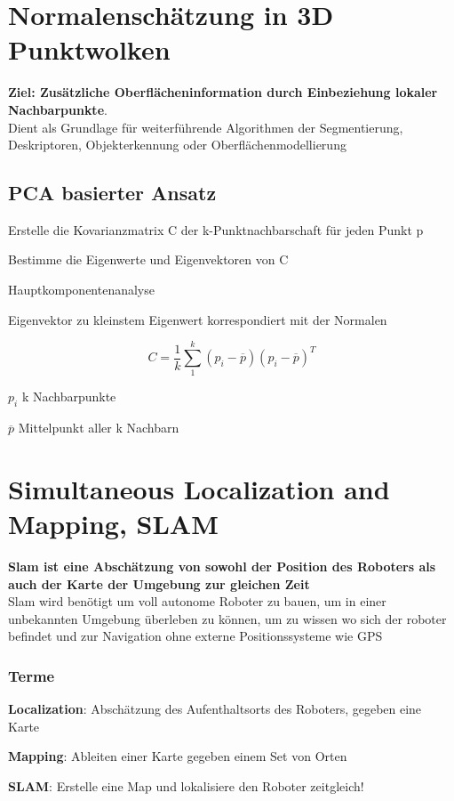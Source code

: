 \section{Normalenschätzung in 3D Punktwolken}
\textbf{Ziel: Zusätzliche Oberflächeninformation durch Einbeziehung lokaler
Nachbarpunkte}. \\
Dient als Grundlage für weiterführende Algorithmen der Segmentierung,
Deskriptoren, Objekterkennung oder Oberflächenmodellierung

\subsection{PCA basierter Ansatz}
\begin{compactitem}
    \item Erstelle die Kovarianzmatrix C der k-Punktnachbarschaft für jeden Punkt p
    \item Bestimme die Eigenwerte und Eigenvektoren von C
    \begin{compactitem}
        \item Hauptkomponentenanalyse
        \item Eigenvektor zu kleinstem Eigenwert korrespondiert mit der Normalen
    \end{compactitem}
\end{compactitem}
\begin{displaymath}
     C = \frac{1}{k}\sum_1^k (p_i - \overline{p})(p_i - \overline{p})^T
\end{displaymath}
\begin{compactitem}
    \item $p_i$ k Nachbarpunkte
    \item $\overline{p}$ Mittelpunkt aller k Nachbarn
\end{compactitem}

\section{Simultaneous Localization and Mapping, SLAM}
\textbf{Slam ist eine Abschätzung von sowohl der Position des Roboters als auch der
Karte der Umgebung zur gleichen Zeit} \\

Slam wird benötigt um voll autonome Roboter zu bauen, um in einer unbekannten
Umgebung überleben zu können, um zu wissen wo sich der roboter befindet und zur
Navigation ohne externe Positionssysteme wie GPS

\subsubsection{Terme}
\begin{compactitem}
    \item \textbf{Localization}: Abschätzung des Aufenthaltsorts des Roboters, gegeben
    eine Karte
    \item \textbf{Mapping}: Ableiten einer Karte gegeben einem Set von Orten
    \item \textbf{SLAM}: Erstelle eine Map und lokalisiere den Roboter zeitgleich!
\end{compactitem}

